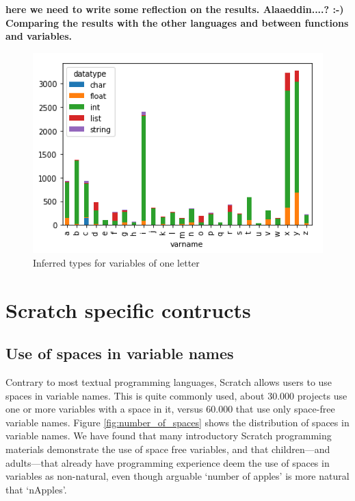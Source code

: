 \documentclass[conference]{IEEEtran}
\newcommand{\todo}[1]{ \textbf{#1} }
\begin{document}
\todo{here we need to write some reflection on the results. Alaaeddin....? :-) Comparing the results with the other languages and between functions and variables.}

\begin{figure}
	\begin{center}
		\includegraphics[width=\columnwidth]{fig/one_letter_type}
		\caption{Inferred types for variables of one letter}
		\label{fig:one_letter_type}
	\end{center}
\end{figure} 


\section{Scratch specific contructs}



\subsection{Use of spaces in variable names}

Contrary to most textual programming languages, Scratch allows users to use spaces in variable names. This is quite commonly used, about 30.000 projects use one or more variables with a space in it, versus 60.000 that use only space-free variable names. Figure \ref{fig:number_of_spaces} shows the distribution of spaces in variable names. We have found that many introductory Scratch programming materials demonstrate the use of space free variables, and that children---and adults---that already have programming experience deem the use of spaces in variables as non-natural, even though arguable `number of apples' is more natural that `nApples'.
\end{document}
